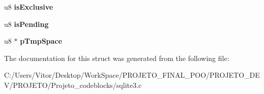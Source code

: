\begin{DoxyCompactItemize}
\item 
\hypertarget{struct_bt_shared_a416a0c0b3e26ed2ffff7e5e0cad53dc2}{u8 {\bfseries is\-Exclusive}}\label{struct_bt_shared_a416a0c0b3e26ed2ffff7e5e0cad53dc2}

\item 
\hypertarget{struct_bt_shared_accae7a07dc99dc2de544d437ab265191}{u8 {\bfseries is\-Pending}}\label{struct_bt_shared_accae7a07dc99dc2de544d437ab265191}

\item 
\hypertarget{struct_bt_shared_a89102c20327da8a304f7e95af557bdf4}{u8 $\ast$ {\bfseries p\-Tmp\-Space}}\label{struct_bt_shared_a89102c20327da8a304f7e95af557bdf4}

\end{DoxyCompactItemize}


The documentation for this struct was generated from the following file\-:\begin{DoxyCompactItemize}
\item 
C\-:/\-Users/\-Vitor/\-Desktop/\-Work\-Space/\-P\-R\-O\-J\-E\-T\-O\-\_\-\-F\-I\-N\-A\-L\-\_\-\-P\-O\-O/\-P\-R\-O\-J\-E\-T\-O\-\_\-\-D\-E\-V/\-P\-R\-O\-J\-E\-T\-O/\-Projeto\-\_\-codeblocks/sqlite3.\-c\end{DoxyCompactItemize}
